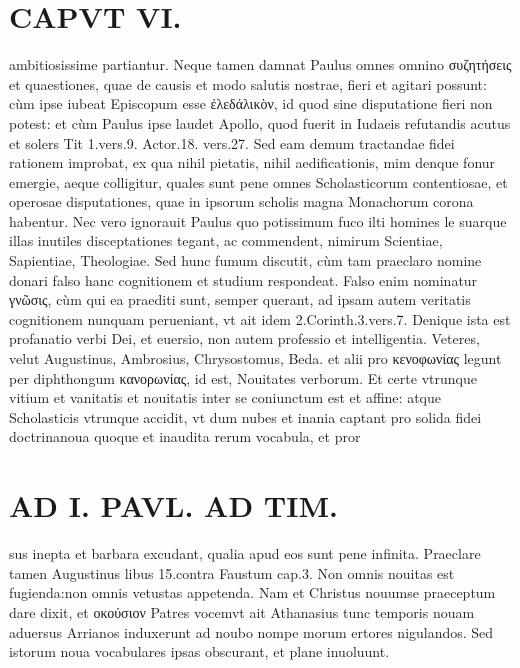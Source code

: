 \documentclass{article}
\begin{document}
\begin{pages}
\section*{CAPVT  VI. }
\marginpar{[ p.511 ]}\pstart ambitiosissime partiantur.  \pend\pstart Neque tamen damnat Paulus omnes omnino συζητήσεις et quaestiones, quae de causis et modo salutis nostrae, fieri et agitari possunt: cùm ipse iubeat Episcopum esse ἐλεδάλικὸν, id quod sine disputatione fieri non potest: et cùm Paulus ipse laudet Apollo, quod fuerit in Iudaeis refutandis acutus et solers Tit 1.vers.9. Actor.18. vers.27. Sed eam demum tractandae fidei rationem improbat, ex qua nihil pietatis, nihil aedificationis, mim denque fonur emergie, aeque colligitur, quales sunt pene omnes Scholasticorum contentiosae, et operosae disputationes, quae in ipsorum scholis magna Monachorum corona habentur.  \pend\pstart Nec vero ignorauit Paulus quo potissimum fuco ilti homines le suarque illas inutiles disceptationes tegant, ac commendent, nimirum Scientiae, Sapientiae, Theologiae. Sed hunc fumum discutit, cùm tam praeclaro nomine donari falso hanc cognitionem et studium respondeat.  \pend\pstart Falso enim nominatur γνῶσις, cùm qui ea praediti sunt, semper querant, ad ipsam autem veritatis cognitionem nunquam perueniant, vt ait idem 2.Corinth.3.vers.7. Denique ista est profanatio verbi Dei, et euersio, non autem professio et intelligentia. Veteres, velut Augustinus, Ambrosius, Chrysostomus, Beda. et alii pro κενοφωνίας legunt per diphthongum κανορωνίας, id est, Nouitates verborum. Et certe vtrunque vitium et vanitatis et nouitatis inter se coniunctum est et affine: atque Scholasticis vtrunque accidit, vt dum nubes et inania captant pro solida fidei doctrinanoua quoque  et inaudita rerum vocabula, et pror\pend
\section*{AD I. PAVL. AD TIM. }
\marginpar{[ p.512 ]}\pstart sus inepta et barbara excudant, qualia apud eos sunt pene infinita. Praeclare tamen Augustinus libus 15.contra Faustum cap.3. Non omnis nouitas est fugienda:non omnis vetustas appetenda. Nam et Christus nouumse praeceptum dare dixit, et οκούσιον Patres vocemvt ait Athanasius tunc temporis nouam aduersus Arrianos induxerunt ad noubo nompe morum ertores nigulandos. Sed istorum noua vocabulares ipsas obscurant, et plane inuoluunt.  \pend
{}
{}

\end{pages}
\end{document}
